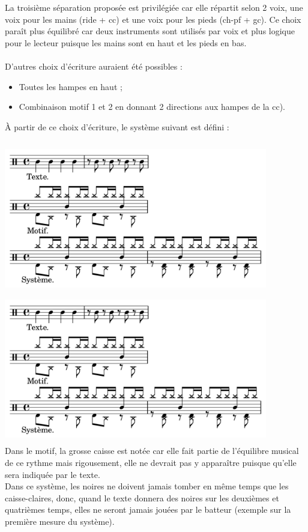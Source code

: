 La troisième séparation proposée est privilégiée car elle répartit selon 2 voix, une voix pour les mains (ride + cc) et une voix pour les pieds (ch-pf + gc). Ce choix paraît plus équilibré car deux instruments sont utilisés par voix et plus logique pour le lecteur puisque les mains sont en haut et les pieds en bas.\\\\
D’autres choix d’écriture auraient été possibles :
\begin{itemize}
	\item Toutes les hampes en haut ;
	\item Combinaison motif 1 et 2 en donnant 2 directions aux hampes de la cc).\\
\end{itemize}
À partir de ce choix d’écriture, le système suivant est défini :\\\\
\includegraphics[height=65mm, width=115mm]{z_images/notation/experimentations/system_drummer_01_session1_004.png}\\
\includegraphics[height=65mm, width=115mm]{z_images/notation/experimentations/system_drummer_01_session1_004.png}\\
Dans le motif, la grosse caisse est notée car elle fait partie de l’équilibre musical de ce rythme mais rigousement, elle ne devrait pas y apparaître puisque qu’elle sera indiquée par le texte.\\
Dans ce système, les noires ne doivent jamais tomber en même temps que les caisse-claires, donc, quand le texte donnera des noires sur les deuxièmes et quatrièmes temps, elles ne seront jamais jouées par le batteur (exemple sur la première mesure du système).\\



